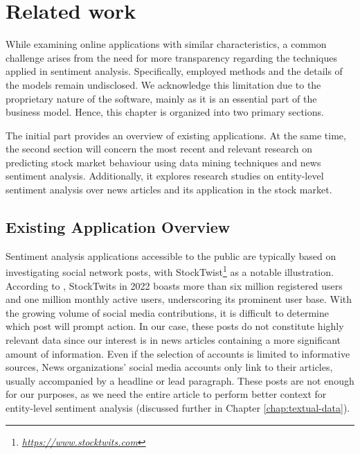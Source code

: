 \chapter{Related work}
\label{chap:related-work}
While examining online applications with similar characteristics, a common challenge arises from the need for more transparency regarding the techniques applied in sentiment analysis. Specifically, employed methods and the details of the models remain undisclosed. We acknowledge this limitation due to the proprietary nature of the software, mainly as it is an essential part of the business model. Hence, this chapter is organized into two primary sections. 

The initial part provides an overview of existing applications. At the same time, the second section will concern the most recent and relevant research on predicting stock market behaviour using data mining techniques and news sentiment analysis. Additionally, it explores research studies on entity-level sentiment analysis over news articles and its application in the stock market.

\section{Existing Application Overview}
\label{sec:existing-application-overview}

Sentiment analysis applications accessible to the public are typically based on investigating social network posts, with StockTwist\footnote{\href{https://www.stocktwits.com}{\textit{https://www.stocktwits.com}}} as a notable illustration. According to \textcite{reuters2022}, StockTwits in 2022 boasts more than six million registered users and one million monthly active users, underscoring its prominent user base. With the growing volume of social media contributions, it is difficult to determine which post will prompt action. In our case, these posts do not constitute highly relevant data since our interest is in news articles containing a more significant amount of information. Even if the selection of accounts is limited to informative sources, News organizations' social media accounts only link to their articles, usually accompanied by a headline or lead paragraph. These posts are not enough for our purposes, as we need the entire article to perform better context for entity-level sentiment analysis (discussed further in Chapter \ref{chap:textual-data}).

